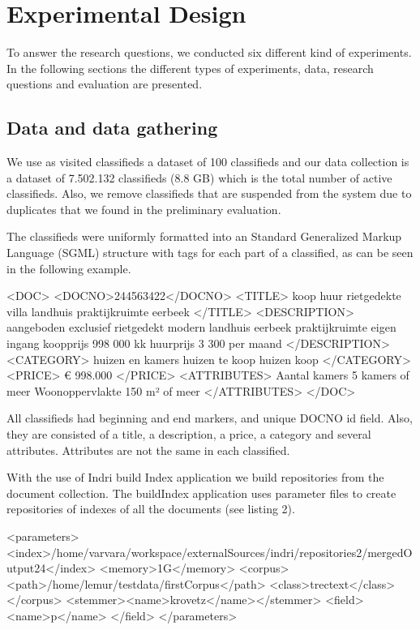 \chapter{Experimental Design}
To answer the research questions, we conducted six different kind of experiments. In the following sections the different types of experiments, data, research questions and evaluation are presented.



\section{Data and data gathering}

We use as visited classifieds a dataset of 100 classifieds and our data collection is a dataset of  7.502.132 classifieds (8.8 GB) which is the total number of active classifieds. Also, we remove classifieds that are suspended from the system due to duplicates that we found in the preliminary evaluation.

The classifieds were uniformly formatted into an Standard Generalized Markup Language (SGML) structure with tags for each part of a classified, as can be seen in the following example.



{\small
\begin{code}[caption={SGML formated classified}]
<DOC>
	<DOCNO>244563422</DOCNO>
	 <TITLE>
		 koop huur rietgedekte villa landhuis praktijkruimte eerbeek
	</TITLE>
	<DESCRIPTION>
		 aangeboden exclusief rietgedekt modern landhuis eerbeek praktijkruimte eigen ingang koopprijs   998 000   kk   huurprijs   3 300   per maand
	</DESCRIPTION>
	<CATEGORY>
		 huizen en kamers huizen te koop  huizen koop
	</CATEGORY>
	<PRICE>
		€ 998.000
	</PRICE>
	<ATTRIBUTES>
	  Aantal kamers 5 kamers of meer Woonoppervlakte 150 m² of meer
	</ATTRIBUTES>
</DOC>
\end{code}
}


All classifieds had beginning and end markers, and unique DOCNO id field. Also, they are consisted of a title, a description, a price, a category and several attributes. Attributes are not the same in each classified.

With the use of Indri build Index application we build repositories from the document collection. The buildIndex application uses parameter files to create repositories of indexes of all the documents (see listing 2).

\begin{code}[caption={Build index parameter file}]
 <parameters>
	<index>/home/varvara/workspace/externalSources/indri/repositories2/mergedOutput24</index>
    <memory>1G</memory>
    <corpus>
      <path>/home/lemur/testdata/firstCorpus</path>
      <class>trectext</class>
    </corpus>
    <stemmer><name>krovetz</name></stemmer>
    <field>
      <name>p</name>
    </field>
  </parameters>
\end{code}


